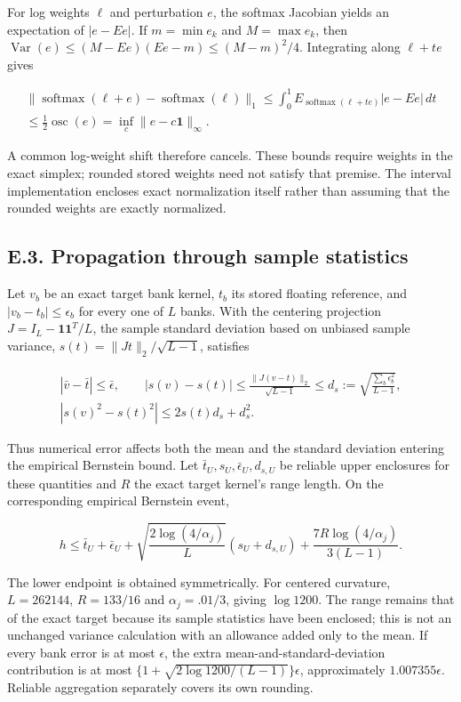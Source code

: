 \documentclass{article}
\begin{document}
For log weights \(\ell\) and perturbation \(e\), the softmax Jacobian
yields an expectation of \(|e-Ee|\). If \(m=\min e_k\) and
\(M=\max e_k\), then
\(\operatorname{Var}(e)\le(M-Ee)(Ee-m)\le(M-m)^2/4\). Integrating along
\(\ell+te\) gives

\[
\begin{gathered}
\|\operatorname{softmax}(\ell+e)-\operatorname{softmax}(\ell)\|_1
\le\int_0^1E_{\operatorname{softmax}(\ell+te)}|e-Ee|\,dt\\
\le\tfrac12\operatorname{osc}(e)
=\inf_c\|e-c\mathbf1\|_\infty.
\end{gathered}
\tag{E.3}
\]

A common log-weight shift therefore cancels. These bounds require
weights in the exact simplex; rounded stored weights need not satisfy
that premise. The interval implementation encloses exact normalization
itself rather than assuming that the rounded weights are exactly
normalized.

\subsection*{E.3. Propagation through sample
statistics}\label{e.3.-propagation-through-sample-statistics}

Let \(v_b\) be an exact target bank kernel, \(t_b\) its stored floating
reference, and \(|v_b-t_b|\le\epsilon_b\) for every one of \(L\) banks.
With the centering projection \(J=I_L-\mathbf1\mathbf1^T/L\), the sample
standard deviation based on unbiased sample variance,
\(s(t)=\|Jt\|_2/\sqrt{L-1}\), satisfies

\[
\begin{gathered}
|\bar v-\bar t|\le\bar\epsilon,\qquad
|s(v)-s(t)|\le\frac{\|J(v-t)\|_2}{\sqrt{L-1}}
\le d_s:=\sqrt{\frac{\sum_b\epsilon_b^2}{L-1}},\\
|s(v)^2-s(t)^2|\le2s(t)d_s+d_s^2.
\end{gathered}
\tag{E.4}
\]

Thus numerical error affects both the mean and the standard deviation
entering the empirical Bernstein bound. Let
\(\bar t_U,s_U,\bar\epsilon_U,d_{s,U}\) be reliable upper enclosures for
these quantities and \(R\) the exact target kernel's range length. On
the corresponding empirical Bernstein event,

\[
h\le\bar t_U+\bar\epsilon_U
+\sqrt{\frac{2\log(4/\alpha_j)}L}(s_U+d_{s,U})
+\frac{7R\log(4/\alpha_j)}{3(L-1)}.
\tag{E.5}
\]

The lower endpoint is obtained symmetrically. For centered curvature,
\(L=262144\), \(R=133/16\) and \(\alpha_j=.01/3\), giving \(\log1200\).
The range remains that of the exact target because its sample statistics
have been enclosed; this is not an unchanged variance calculation with
an allowance added only to the mean. If every bank error is at most
\(\epsilon\), the extra mean-and-standard-deviation contribution is at
most \(\{1+\sqrt{2\log1200/(L-1)}\}\epsilon\), approximately
\(1.007355\epsilon\). Reliable aggregation separately covers its own
rounding.
\end{document}
